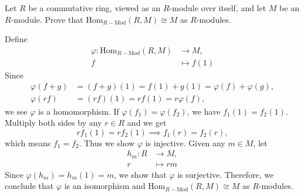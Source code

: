 \documentclass[12pt,letterpaper,boxed]{hmcpset}
\begin{document}
\begin{problem}[5.5]
Let $R$ be a commutative ring, viewed as an $R$-module over itself, and let $M$ be an $R$-module. Prove that $\mathrm{Hom}_{R-\mathrm{Mod}}(R, M) \cong M$ as $R$-modules.
\end{problem}
\begin{solution}
	Define
	\begin{align*}
	\varphi:\mathrm{Hom}_{R-\mathrm{Mod}}(R, M)& \longrightarrow M,\\
	f& \longmapsto f(1)
	\end{align*}
	Since
	\begin{align*}
	\varphi(f+g)&=(f+g)(1)=f(1)+g(1)=\varphi(f)+\varphi(g),\\
	\varphi(rf)&=(rf)(1)=rf(1)=r\varphi(f),
	\end{align*}
	we see $\varphi$ is a homomorphism.
	If $\varphi(f_1)=\varphi(f_2)$, we have $f_1(1)=f_2(1)$. Multiply both sides by any $r\in R$ and we get
	\[
	rf_1(1)=rf_2(1)\implies f_1(r)=f_2(r),
	\]
	which means $f_1=f_2$. Thus we show $\varphi$ is injective. Given any $m\in M$, let
	\begin{align*}
	h_m:R& \longrightarrow M,\\
	r& \longmapsto rm
	\end{align*}
	Since $\varphi(h_m)=h_m(1)=m$, we show that $\varphi$ is surjective. Therefore, we conclude that $\varphi$ is an isomorphism and $\mathrm{Hom}_{R-\mathrm{Mod}}(R, M) \cong M$ as $R$-modules.
\end{solution}
\end{document}
